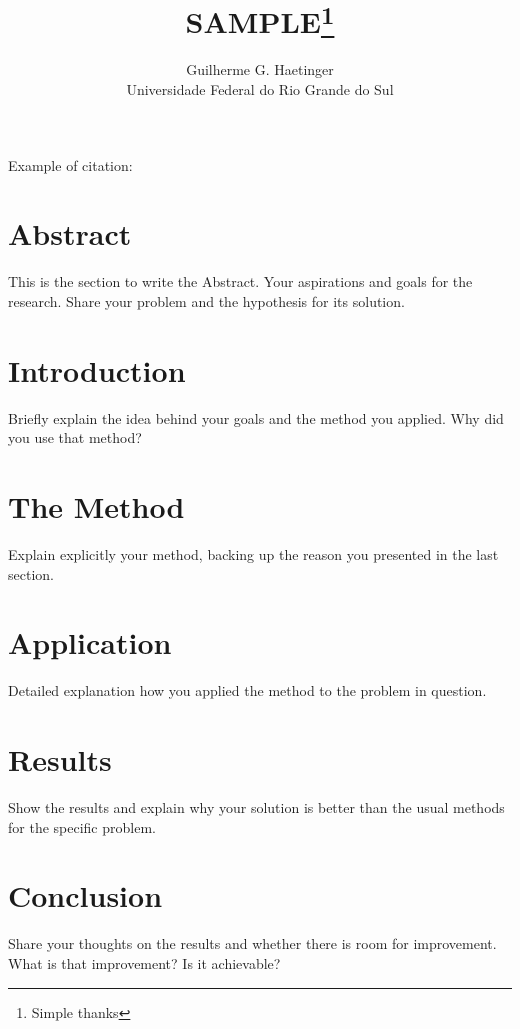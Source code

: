 \documentclass[12pt, twocolumn]{article}
\title{SAMPLE\thanks{Simple thanks}}
\author{Guilherme G. Haetinger\\ Universidade Federal do Rio Grande do Sul}
\begin{document}
\setlength{\columnsep}{20pt}
\maketitle
	Example of citation: \cite{KELVINLETS:1} 
	\section{Abstract}
		This is the section to write the Abstract. Your aspirations and goals for the research. Share your problem and the hypothesis for its solution.

	\section{Introduction}
		Briefly explain the idea behind your goals and the method you applied. Why did you use that method?
	
	\section{The Method}
		Explain explicitly your method, backing up the reason you presented in the last section.

	\section{Application}
		Detailed explanation how you applied the method to the problem in question.

	\section{Results}
		Show the results and explain why your solution is better than the usual methods for the specific problem.

	\section{Conclusion}
		Share your thoughts on the results and whether there is room for improvement. What is that improvement? Is it achievable?

	
	
\end{document}
